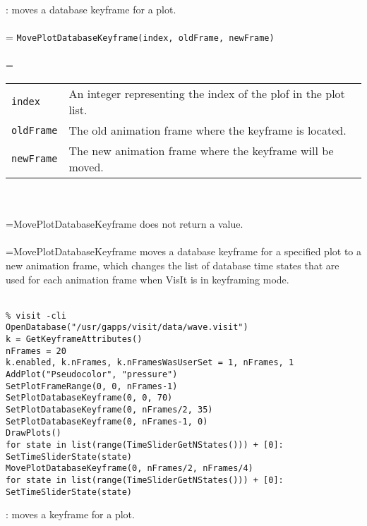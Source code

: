 \documentclass[10pt,a4paper]{report}
\begin{document}
{}
: moves a database keyframe for a plot.\\[-3mm]

 \\ 
\hangindent=\parindent 
\verb!MovePlotDatabaseKeyframe(index, oldFrame, newFrame)!\\ [-3mm]

 \\ 
\hangindent=\parindent 
\begin{tabular}{lp{9cm}}
\verb!index! & An integer representing the index of the plof in the plot list. \\
\verb!oldFrame! & The old animation frame where the keyframe is located. \\
\verb!newFrame! & The new animation frame where the keyframe will be moved. \\
\end{tabular} \\[-2mm]


 \\ 
\hangindent=\parindent MovePlotDatabaseKeyframe does not return a value. \\[-3mm] 

 \\ 
\hangindent=\parindent MovePlotDatabaseKeyframe moves a database keyframe for a specified plot to a new animation frame, which changes the list of database time states that are used for each animation frame when VisIt is in keyframing mode. \\[-3mm] 

\\[-6mm]
\begin{verbatim}% visit -cli
OpenDatabase("/usr/gapps/visit/data/wave.visit")
k = GetKeyframeAttributes()
nFrames = 20
k.enabled, k.nFrames, k.nFramesWasUserSet = 1, nFrames, 1
AddPlot("Pseudocolor", "pressure")
SetPlotFrameRange(0, 0, nFrames-1)
SetPlotDatabaseKeyframe(0, 0, 70)
SetPlotDatabaseKeyframe(0, nFrames/2, 35)
SetPlotDatabaseKeyframe(0, nFrames-1, 0)
DrawPlots()
for state in list(range(TimeSliderGetNStates())) + [0]:
SetTimeSliderState(state)
MovePlotDatabaseKeyframe(0, nFrames/2, nFrames/4)
for state in list(range(TimeSliderGetNStates())) + [0]:
SetTimeSliderState(state)
\end{verbatim}
\newpage


{}
: moves a keyframe for a plot.\\[-3mm]
\end{document}
